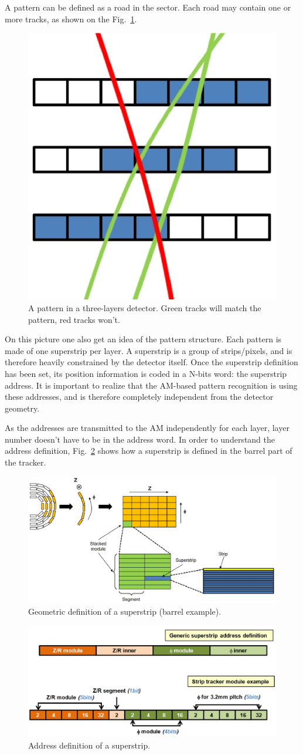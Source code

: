 \noindent A pattern can be defined as a road in the sector. Each road may contain one or more tracks, as shown on the Fig.~\ref{fig:pattern}. 
\begin{figure}[ht!]
\centering
\includegraphics[width=0.3\columnwidth]{Plots/Pattern.eps}
\caption{A pattern in a three-layers detector. Green tracks will match the pattern, red tracks won't.}
\label{fig:pattern}
\end{figure}

\noindent On this picture one also get an idea of the pattern structure. Each pattern is made of one superstrip per layer. A superstrip is a group of strips/pixels, and is therefore heavily constrained by the detector itself. Once the superstrip definition has been set, its position information is coded in a N-bits word: the superstrip address. It is important to realize that the AM-based pattern recognition is using these addresses, and is therefore completely independent from the detector geometry.

\noindent As the addresses are transmitted to the AM independently for each layer, layer number doesn't have to be in the address word. In order to understand the address definition, Fig.~\ref{fig:sstrip_def} shows how a superstrip is defined in the barrel part of the tracker.  
\begin{figure}[ht!]
\centering
\includegraphics[width=0.7\columnwidth]{Plots/SStripDef.eps}
\caption{Geometric definition of a superstrip (barrel example).}
\label{fig:sstrip_def}
\end{figure}
\begin{figure}[ht!]
\centering
\includegraphics[width=0.7\columnwidth]{Plots/SSaddress.eps}
\caption{Address definition of a superstrip.}
\label{fig:SS_code}
\end{figure}


